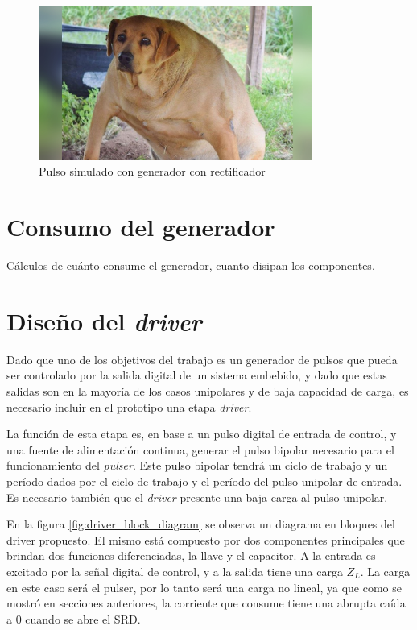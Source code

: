 \begin{figure}[tbp]
    \centering
    \includegraphics[width=0.8\textwidth]{images/placeholder.jpg}
    \caption{Pulso simulado con generador con rectificador}
    \label{fig:schottky_generator_result_pulse}
\end{figure}

\section{Consumo del generador}

Cálculos de cuánto consume el generador, cuanto disipan los componentes.

\section{Diseño del \textit{driver}}

Dado que uno de los objetivos del trabajo es un generador de pulsos que pueda
ser controlado por la salida digital de un sistema embebido, y dado que estas
salidas son en la mayoría de los casos unipolares y de baja capacidad de carga,
es necesario incluir en el prototipo una etapa \textit{driver}.

La función de esta etapa es, en base a un pulso digital de entrada de control, y
una fuente de alimentación continua, generar el pulso bipolar necesario para el
funcionamiento del \textit{pulser}. Este pulso bipolar tendrá un ciclo de
trabajo y un período dados por el ciclo de trabajo y el período del pulso
unipolar de entrada. Es necesario también que el \textit{driver} presente una
baja carga al pulso unipolar.

En la figura \ref{fig:driver_block_diagram} se observa un diagrama en bloques
del driver propuesto. El mismo está compuesto por dos componentes principales
que brindan dos funciones diferenciadas, la llave y el capacitor. A la entrada
es excitado por la señal digital de control, y a la salida tiene una carga
$Z_L$. La carga en este caso será el pulser, por lo tanto será una carga no
lineal, ya que como se mostró en secciones anteriores, la corriente que consume
tiene una abrupta caída a 0 cuando se abre el SRD.

